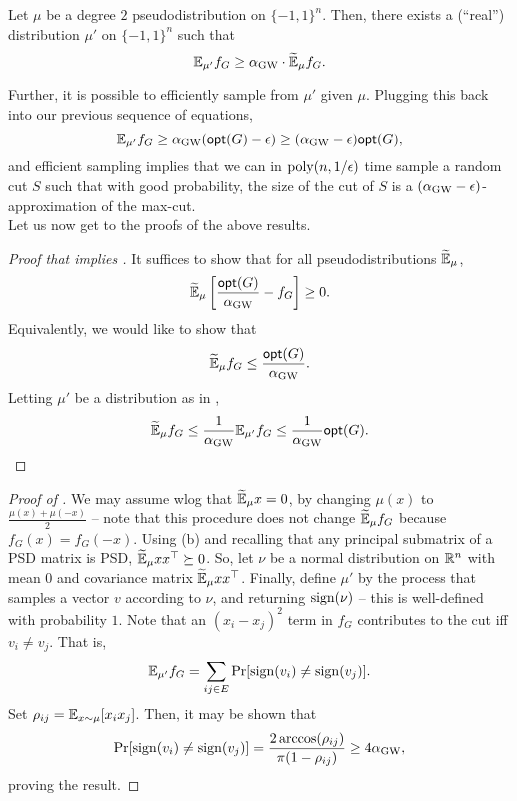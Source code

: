 	\begin{flem}
		\label{eqn: gw-pd-to-rd}
		Let $\mu$ be a degree $2$ pseudodistribution on $\{-1,1\}^n$. Then, there exists a (``real'') distribution $\mu'$ on $\{-1,1\}^n$ such that
		\[ \mathbb{E}_{\mu'} f_G \ge \alpha_{\text{GW}} \cdot \widetilde{\mathbb{E}}_{\mu} f_G. \]
	\end{flem}
	Further, it is possible to efficiently sample from $\mu'$ given $\mu$. Plugging this back into our previous sequence of equations,
	\[ \mathbb{E}_{\mu'} f_G \ge \alpha_{\text{GW}}(\mathsf{opt}(G) - \epsilon) \ge (\alpha_{\text{GW}} - \epsilon) \mathsf{opt}(G), \]
	and efficient sampling implies that we can in $\operatorname{poly}(n,1/\epsilon)$ time sample a random cut $S$ such that with good probability, the size of the cut of $S$ is a $(\alpha_{\text{GW}}-\epsilon)$-approximation of the max-cut.\\
	Let us now get to the proofs of the above results.

	\begin{proof}[Proof that  implies ]
		It suffices to show that for all pseudodistributions $\widetilde{\mathbb{E}}_\mu$,
		\[ \widetilde{\mathbb{E}}_\mu \left[ \frac{\mathsf{opt}(G)}{\alpha_{\text{GW}}} - f_G \right] \ge 0. \]
		Equivalently, we would like to show that
		\[ \widetilde{\mathbb{E}}_\mu f_G \le \frac{\mathsf{opt}(G)}{\alpha_{\text{GW}}}. \]
		Letting $\mu'$ be a distribution as in ,
		\[ \widetilde{\mathbb{E}}_\mu f_G \le \frac{1}{\alpha_{\text{GW}}} \mathbb{E}_{\mu'} f_G \le \frac{1}{\alpha_{\text{GW}}} \mathsf{opt}(G). \qedhere \]
	\end{proof}

	\begin{proof}[Proof of ]
		We may assume wlog that $\widetilde{\mathbb{E}}_\mu x = 0$, by changing $\mu(x)$ to $\frac{\mu(x) + \mu(-x)}{2}$ -- note that this procedure does not change $\widetilde{\mathbb{E}}_\mu f_G$ because $f_G(x) = f_G(-x)$. Using (b) and recalling that any principal submatrix of a PSD matrix is PSD, $\widetilde{\mathbb{E}}_\mu xx^\top \succeq 0$. So, let $\nu$ be a normal distribution on $\mathbb{R}^n$ with mean $0$ and covariance matrix $\widetilde{\mathbb{E}}_\mu xx^\top$. Finally, define $\mu'$ by the process that samples a vector $v$ according to $\nu$, and returning $\operatorname{sign}(\nu)$ -- this is well-defined with probability $1$. Note that an $(x_i - x_j)^2$ term in $f_G$ contributes to the cut iff $v_i \ne v_j$. That is,
		\[ \mathbb{E}_{\mu'} f_G = \sum_{ij \in E} \Pr[\operatorname{sign}(v_i) \ne \operatorname{sign}(v_j)]. \]
		Set $\rho_{ij} = \mathbb{E}_{x \sim \mu}[x_i x_j]$. Then, it may be shown that
		\[ \Pr[\operatorname{sign}(v_i) \ne \operatorname{sign}(v_j)] = \frac{2\arccos(\rho_{ij})}{\pi(1-\rho_{ij})} \ge 4\alpha_{\text{GW}}, \]
		proving the result.
	\end{proof}